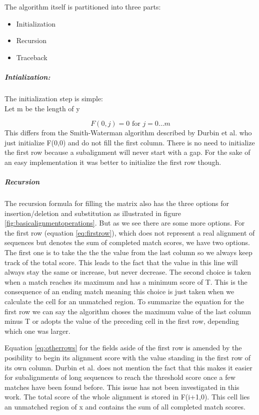 The algorithm itself is partitioned into three parts: 

\begin{itemize}
	\item Initialization
	\item Recursion
	\item Traceback
\end{itemize}

\subparagraph{Intialization:}
	The initialization step is simple: \\
	Let m be the length of y
	
	\begin{equation*}
		F(0,j) = 0 \text{ for } j=0\dotsc m
	\end{equation*}
	This differs from the Smith-Waterman algorithm described by Durbin et al.\cite{durbin1998} who just initialize F(0,0) and do not fill the first column. There is no need to initialize the first row because a subalignment will never start with a gap. For the sake of an easy implementation it was better to initialize the first row though.

\subparagraph{Recursion}
The recursion formula for filling the matrix also has the three options for insertion/deletion and substitution as illustrated in figure \ref{fig:basicalignmentoperations}.
But as we see there are some more options. 
For the first row (equation \ref{eq:firstrow}), which does not represent a real alignment of sequences but denotes the sum of completed match scores, we have two options. 
The first one is to take the the the value from the last column so we always keep track of the total score. 
This leads to the fact that the value in this line will always stay the same or increase, but never decrease.
The second choice is taken when a match reaches its maximum and has a minimum score of T. 
This is the consequence of an ending match meaning this choice is just taken when we calculate the cell for an unmatched region.
To summarize the equation for the first row we can say the algorithm choses the maximum value of the last column minus T or adopts the value of the preceding cell in the first row, depending which one was larger. 

Equation \ref{eq:otherrows} for the fields aside of the first row is amended by the posibility to begin its alignment score with the value standing in the first row of its own column. 
Durbin et al. does not mention the fact that this makes it easier for subalignments of long sequences to reach the threshold score once a few matches have been found before.
This issue has not been investigated in this work. 
The total score of the whole alignment is stored in F(i+1,0). This cell lies an unmatched region of x and contains the sum of all completed match scores.


